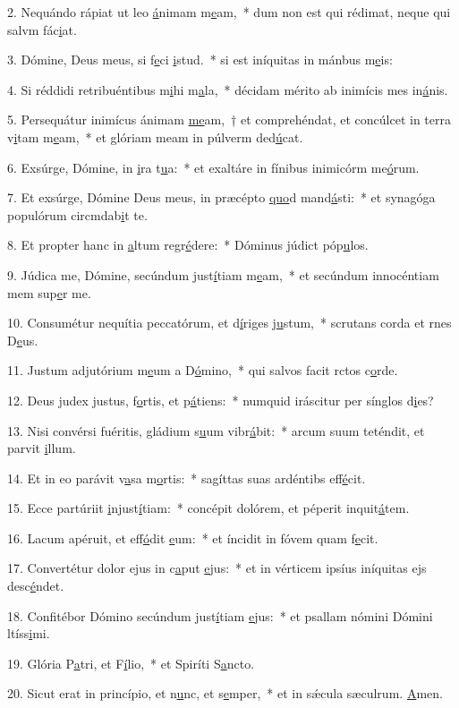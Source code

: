 2. Nequándo rápiat ut leo \uline{á}nimam m\uline{e}am,~* dum non est qui rédimat, neque qui salvm fác\uline{i}at.\par 
3. Dómine, Deus meus, si f\uline{e}ci \uline{i}stud.~* si est iníquitas in mánbus m\uline{e}is:\par 
4. Si réddidi retribuéntibus m\uline{i}hi m\uline{a}la,~* décidam mérito ab inimícis mes in\uline{á}nis.\par 
5. Persequátur inimícus ánimam \uline{me}am,~† et comprehéndat, et concúlcet in terra v\uline{i}tam m\uline{e}am,~* et glóriam meam in púlverm ded\uline{ú}cat.\par 
6. Exsúrge, Dómine, in \uline{i}ra t\uline{u}a:~* et exaltáre in fínibus inimicórm me\uline{ó}rum.\par 
7. Et exsúrge, Dómine Deus meus, in præcépto \uline{quo}d mand\uline{á}sti:~* et synagóga populórum circmdab\uline{i}t te.\par 
8. Et propter hanc in \uline{a}ltum regr\uline{é}dere:~* Dóminus júdict póp\uline{u}los.\par 
9. Júdica me, Dómine, secúndum just\uline{í}tiam m\uline{e}am,~* et secúndum innocéntiam mem sup\uline{e}r me.\par 
10. Consumétur nequítia peccatórum, et d\uline{í}riges j\uline{u}stum,~* scrutans corda et rnes D\uline{e}us.\par 
11. Justum adjutórium m\uline{e}um a D\uline{ó}mino,~* qui salvos facit rctos c\uline{o}rde.\par 
12. Deus judex justus, f\uline{o}rtis, et p\uline{á}tiens:~* numquid iráscitur per sínglos d\uline{i}es?\par 
13. Nisi convérsi fuéritis, gládium s\uline{u}um vibr\uline{á}bit:~* arcum suum teténdit, et parvit \uline{i}llum.\par 
14. Et in eo parávit v\uline{a}sa m\uline{o}rtis:~* sagíttas suas ardéntibs eff\uline{é}cit.\par 
15. Ecce partúriit \uline{i}njust\uline{í}tiam:~* concépit dolórem, et péperit inquit\uline{á}tem.\par 
16. Lacum apéruit, et eff\uline{ó}dit \uline{e}um:~* et íncidit in fóvem quam f\uline{e}cit.\par 
17. Convertétur dolor ejus in c\uline{a}put \uline{e}jus:~* et in vérticem ipsíus iníquitas ejs desc\uline{é}ndet.\par 
18. Confitébor Dómino secúndum just\uline{í}tiam \uline{e}jus:~* et psallam nómini Dómini ltíss\uline{i}mi.\par 
19. Glória P\uline{a}tri, et F\uline{í}lio,~* et Spiríti S\uline{a}ncto.\par 
20. Sicut erat in princípio, et n\uline{u}nc, et s\uline{e}mper,~* et in sǽcula sæculrum. \uline{A}men.\par 
